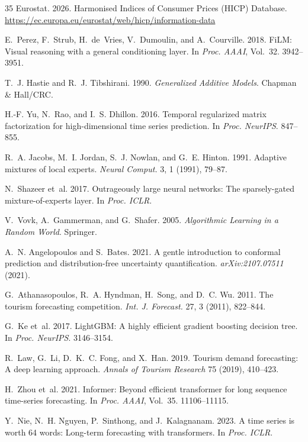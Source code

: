 \documentclass[sigconf]{acmart}
\begin{document}
\begin{thebibliography}{35}
Eurostat. 2026. Harmonised Indices of Consumer Prices (HICP) Database. \url{https://ec.europa.eu/eurostat/web/hicp/information-data}

E.~Perez, F.~Strub, H.~de~Vries, V.~Dumoulin, and A.~Courville. 2018. FiLM: Visual reasoning with a general conditioning layer. In \emph{Proc. AAAI}, Vol.~32. 3942--3951.

T.~J. Hastie and R.~J. Tibshirani. 1990. \emph{Generalized Additive Models}. Chapman \& Hall/CRC.

H.-F. Yu, N.~Rao, and I.~S. Dhillon. 2016. Temporal regularized matrix factorization for high-dimensional time series prediction. In \emph{Proc. NeurIPS}. 847--855.

R.~A. Jacobs, M.~I. Jordan, S.~J. Nowlan, and G.~E. Hinton. 1991. Adaptive mixtures of local experts. \emph{Neural Comput.} 3, 1 (1991), 79--87.

N.~Shazeer et~al. 2017. Outrageously large neural networks: The sparsely-gated mixture-of-experts layer. In \emph{Proc. ICLR}.

V.~Vovk, A.~Gammerman, and G.~Shafer. 2005. \emph{Algorithmic Learning in a Random World}. Springer.

A.~N. Angelopoulos and S.~Bates. 2021. A gentle introduction to conformal prediction and distribution-free uncertainty quantification. \emph{arXiv:2107.07511} (2021).

G.~Athanasopoulos, R.~A. Hyndman, H.~Song, and D.~C. Wu. 2011. The tourism forecasting competition. \emph{Int. J. Forecast.} 27, 3 (2011), 822--844.

G.~Ke et~al. 2017. LightGBM: A highly efficient gradient boosting decision tree. In \emph{Proc. NeurIPS}. 3146--3154.

R.~Law, G.~Li, D.~K.~C. Fong, and X.~Han. 2019. Tourism demand forecasting: A deep learning approach. \emph{Annals of Tourism Research} 75 (2019), 410--423.

H.~Zhou et~al. 2021. Informer: Beyond efficient transformer for long sequence time-series forecasting. In \emph{Proc. AAAI}, Vol.~35. 11106--11115.

Y.~Nie, N.~H. Nguyen, P.~Sinthong, and J.~Kalagnanam. 2023. A time series is worth 64 words: Long-term forecasting with transformers. In \emph{Proc. ICLR}.


\end{thebibliography}
\end{document}
